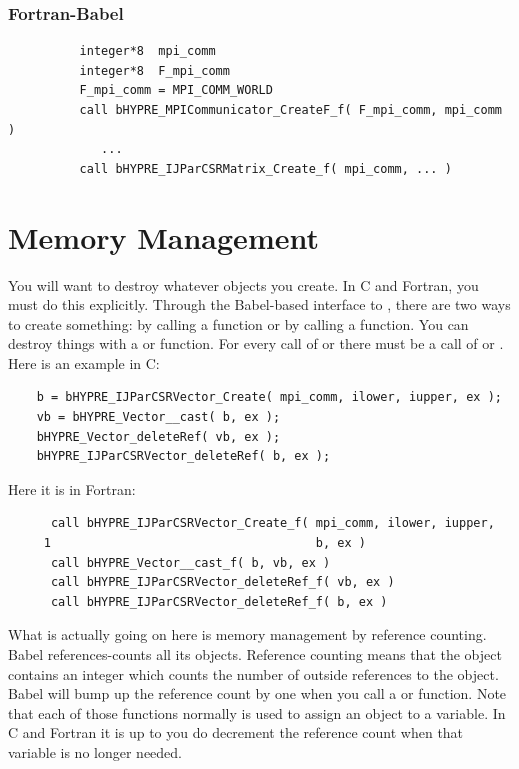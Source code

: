 \subsubsection{Fortran-Babel}
\begin{verbatim}
          integer*8  mpi_comm
          integer*8  F_mpi_comm
          F_mpi_comm = MPI_COMM_WORLD
          call bHYPRE_MPICommunicator_CreateF_f( F_mpi_comm, mpi_comm )
             ...
          call bHYPRE_IJParCSRMatrix_Create_f( mpi_comm, ... )
\end{verbatim}

\section{Memory Management}

You will want to destroy whatever objects you create.  In C and
Fortran, you must do this explicitly.  Through the Babel-based
interface to \hypre{}, there are two ways to create something: by
calling a  function or by calling a
 function. You can destroy things with a 
or  function.  For every call of  or
 there must be a call of  or
.  Here is an example in C:
\begin{verbatim}
    b = bHYPRE_IJParCSRVector_Create( mpi_comm, ilower, iupper, ex );
    vb = bHYPRE_Vector__cast( b, ex );
    bHYPRE_Vector_deleteRef( vb, ex );
    bHYPRE_IJParCSRVector_deleteRef( b, ex );
\end{verbatim}
Here it is in Fortran:
\begin{verbatim}
      call bHYPRE_IJParCSRVector_Create_f( mpi_comm, ilower, iupper,
     1                                     b, ex )
      call bHYPRE_Vector__cast_f( b, vb, ex )
      call bHYPRE_IJParCSRVector_deleteRef_f( vb, ex )
      call bHYPRE_IJParCSRVector_deleteRef_f( b, ex )
\end{verbatim}

What is actually going on here is memory management by reference
counting.  Babel references-counts all its objects.  Reference
counting means that the object contains an integer which counts the
number of outside references to the object.  Babel will bump up the
reference count by one when you call a  or 
function.  Note that each of those functions normally is used to
assign an object to a variable.  In C and Fortran it is up to you do
decrement the reference count when that variable is no longer needed.

